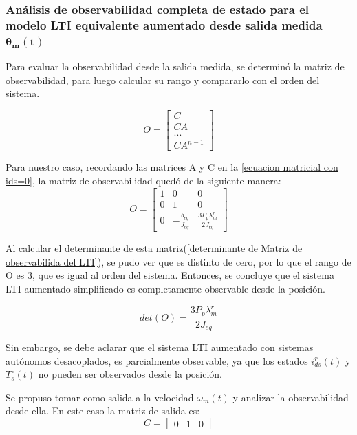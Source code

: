 \documentclass[a4paper, 10pt, onecolumn,journal]{ieeeconf}
\begin{document}
\subsubsection{\textbf{Análisis de observabilidad completa de estado para el modelo LTI equivalente aumentado desde salida medida $\mathbf{\theta_m(t)}$}}

Para evaluar la observabilidad desde la salida medida, se determinó la matriz de observabilidad, para luego calcular su rango y compararlo con el orden del sistema.

\begin{equation}
	O=
	\begin{bmatrix}
		C \\ 
		CA\\
		...\\
		CA^{n-1}  
	\end{bmatrix}
	\label{Matriz de observabilida generica}
\end{equation}

Para nuestro caso, recordando las matrices A y C en la \cref{ecuacion matricial con ids=0}, la matriz de observabilidad quedó de la siguiente manera:
\begin{equation}
	O=
	\begin{bmatrix}
		1 & 0 & 0 \\ 
		0 & 1 & 0\\
		 0 & -\frac{b_{eq}}{J_{eq}} & \frac{3 P_p \lambda^r_m}{2 J_{eq}}  
	\end{bmatrix}
	\label{Matriz de observabilida del LTI}
\end{equation}

Al calcular el determinante de esta matriz(\cref{determinante de Matriz de observabilida del LTI}), se pudo ver que es distinto de cero, por lo que el rango de O es 3, que es igual al orden del sistema. Entonces, se concluye que el sistema LTI aumentado simplificado es completamente observable desde la posición.

\begin{equation}
	det(O)= \frac{3 P_p \lambda^r_m}{2 J_{eq}}
	\label{determinante de Matriz de observabilida del LTI}
\end{equation}

Sin embargo, se debe aclarar que el sistema LTI aumentado con sistemas autónomos desacoplados, es parcialmente observable, ya que los estados ${i}^r_{ds}(t) $ y ${T}^\circ_s(t)$ no pueden ser observados desde la posición.

Se propuso tomar como salida a la velocidad ${\omega}_m(t)$ y analizar la observabilidad desde ella. En este caso la matriz de salida es:
\begin{equation}
	C=
	\begin{bmatrix}
		0 & 1 & 0  
	\end{bmatrix}
	\label{Matriz C con velocidad como salida}
\end{equation}
\end{document}
